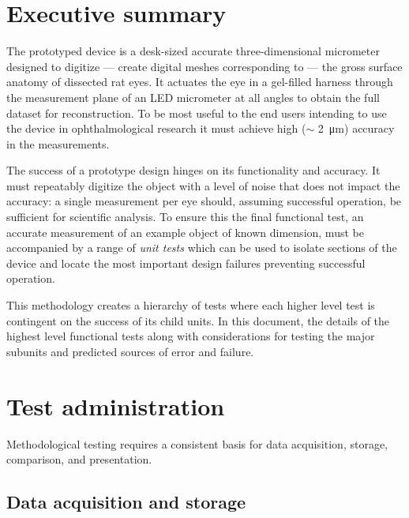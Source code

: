 \documentclass{article}
\begin{document}

\setcounter{tocdepth}{3}
\tableofcontents
\newpage

\section*{Executive summary}
\label{sec:exec-summary}


\newpage

The prototyped device is a desk-sized accurate three-dimensional micrometer designed to digitize --- create digital meshes corresponding to --- the gross surface anatomy of dissected rat eyes. It actuates the eye in a gel-filled harness through the measurement plane of an LED micrometer at all angles to obtain the full dataset for reconstruction. To be most useful to the end users intending to use the device in ophthalmological research it must achieve high ($\sim$ \SI{2}{\micro m}) accuracy in the measurements.

The success of a prototype design hinges on its functionality and accuracy. It must repeatably digitize the object with a level of noise that does not impact the accuracy: a single measurement per eye should, assuming successful operation, be sufficient for scientific analysis. To ensure this the final functional test, an accurate measurement of an example object of known dimension, must be accompanied by a range of \textit{unit tests} which can be used to isolate sections of the device and locate the most important design failures preventing successful operation.

This methodology creates a hierarchy of tests where each higher level test is contingent on the success of its child units. In this document, the details of the highest level functional tests along with considerations for testing the major subunits and predicted sources of error and failure.

\section{Test administration}
\label{sec:test-administration}

Methodological testing requires a consistent basis for data acquisition, storage, comparison, and presentation.

\subsection{Data acquisition and storage}
\label{sec:data-acqu-stor}
\end{document}

